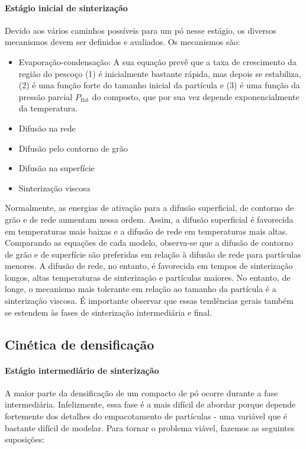 \paragraph*{Estágio inicial de sinterização} Devido aos vários caminhos possíveis para um pó nesse estágio, os diversos mecanismos devem ser definidos e avaliados. Os mecanismos são:

\begin{itemize}
    \item Evaporação-condensação: A sua equação prevê que a taxa de crescimento da região do pescoço (1) é inicialmente bastante rápida, mas depois se estabiliza, (2) é uma função forte do tamanho inicial da partícula e (3) é uma função da pressão parcial $P_{\text{flat}}$ do composto, que por sua vez depende exponencialmente da temperatura.
    \item Difusão na rede
    \item Difusão pelo contorno de grão
    \item Difusão na superfície
    \item Sinterização viscosa
\end{itemize}

Normalmente, as energias de ativação para a difusão superficial, de contorno de grão e de rede aumentam nessa ordem. Assim, a difusão superficial é favorecida em temperaturas mais baixas e a difusão de rede em temperaturas mais altas. Comparando as equações de cada modelo, observa-se que a difusão de contorno de grão e de superfície são preferidas em relação à difusão de rede para partículas menores. A difusão de rede, no entanto, é favorecida em tempos de sinterização longos, altas temperaturas de sinterização e partículas maiores. No entanto, de longe, o mecanismo mais tolerante em relação ao tamanho da partícula é a sinterização viscosa. É importante observar que essas tendências gerais também se estendem às fases de sinterização intermediária e final.

\subsection*{Cinética de densificação}

\paragraph*{Estágio intermediário de sinterização}

A maior parte da densificação de um compacto de pó ocorre durante a fase intermediária. Infelizmente, essa fase é a mais difícil de abordar porque depende fortemente dos detalhes do empacotamento de partículas - uma variável que é bastante difícil de modelar. Para tornar o problema viável, fazemos as seguintes suposições:

